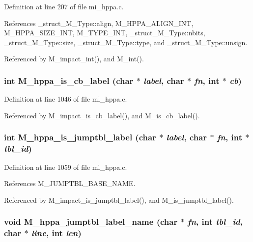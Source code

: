 Definition at line 207 of file mi\_\-hppa.c.

References \_\-struct\_\-M\_\-Type::align, M\_\-HPPA\_\-ALIGN\_\-INT, M\_\-HPPA\_\-SIZE\_\-INT, M\_\-TYPE\_\-INT, \_\-struct\_\-M\_\-Type::nbits, \_\-struct\_\-M\_\-Type::size, \_\-struct\_\-M\_\-Type::type, and \_\-struct\_\-M\_\-Type::unsign.

Referenced by M\_\-impact\_\-int(), and M\_\-int().
\subsubsection{\setlength{\rightskip}{0pt plus 5cm}int M\_\-hppa\_\-is\_\-cb\_\-label (char $\ast$ {\em label}, char $\ast$ {\em fn}, int $\ast$ {\em cb})}\label{m__hppa_8h_b557b1da6cb9fe60c27045b59c76075e}




Definition at line 1046 of file ml\_\-hppa.c.

Referenced by M\_\-impact\_\-is\_\-cb\_\-label(), and M\_\-is\_\-cb\_\-label().
\subsubsection{\setlength{\rightskip}{0pt plus 5cm}int M\_\-hppa\_\-is\_\-jumptbl\_\-label (char $\ast$ {\em label}, char $\ast$ {\em fn}, int $\ast$ {\em tbl\_\-id})}\label{m__hppa_8h_bba6c2e63f7c1343093c6d3b95cd1cd4}




Definition at line 1059 of file ml\_\-hppa.c.

References M\_\-JUMPTBL\_\-BASE\_\-NAME.

Referenced by M\_\-impact\_\-is\_\-jumptbl\_\-label(), and M\_\-is\_\-jumptbl\_\-label().
\subsubsection{\setlength{\rightskip}{0pt plus 5cm}void M\_\-hppa\_\-jumptbl\_\-label\_\-name (char $\ast$ {\em fn}, int {\em tbl\_\-id}, char $\ast$ {\em line}, int {\em len})}\label{m__hppa_8h_a762a696b15fa48d0a3927f99880608e}




